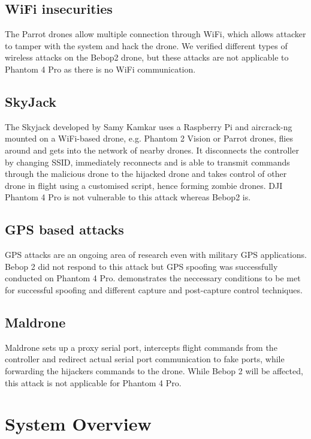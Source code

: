 \documentclass[conference]{IEEEtran}
\begin{document}
\subsection{WiFi insecurities}
The Parrot drones allow multiple connection through WiFi, which allows attacker to tamper with the system and hack the drone. We verified different types of wireless attacks on the Bebop2 drone, but these attacks are not applicable to Phantom 4 Pro as there is no WiFi communication.

\subsection{SkyJack}
The Skyjack\cite{skyjack} developed by Samy Kamkar uses a Raspberry Pi and aircrack-ng\cite{aircrack} mounted on a WiFi-based drone, e.g. Phantom 2 Vision or Parrot drones, flies around and gets into the network of nearby drones. It disconnects the controller by changing SSID, immediately reconnects and is able to transmit commands through the malicious drone to the hijacked drone and takes control of other drone in flight using a customised script, hence forming zombie drones. DJI Phantom 4 Pro is not vulnerable to this attack whereas Bebop2 is. 

\subsection{GPS based attacks}
GPS attacks are an ongoing area of research even with military GPS applications. Bebop 2 did not respond to this attack but GPS spoofing was successfully conducted on Phantom 4 Pro. \cite{ROB:ROB21513} demonstrates the neccessary conditions to be met for successful spoofing and different capture and post-capture control techniques.

\subsection{Maldrone}
Maldrone\cite{maldrone} sets up a proxy serial port, intercepts flight commands from the controller and redirect actual serial port communication to fake ports, while forwarding the hijackers commands to the drone. While Bebop 2 will be affected, this attack is not applicable for Phantom 4 Pro.

\section{System Overview}\label{System Overview}
\end{document}
